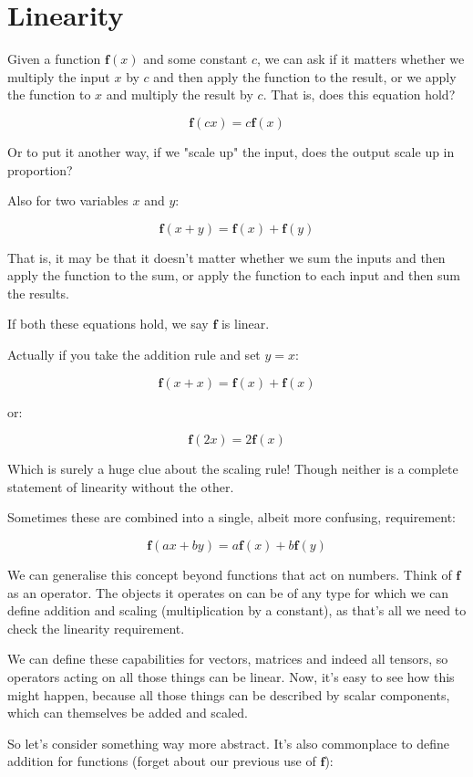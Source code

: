 \chapter{Linearity}

Given a function $\mathbf{f}(x)$ and some constant $c$, we can ask if it matters whether we multiply the input $x$ by $c$ and then apply the function to the result, or we apply the function to $x$ and multiply the result by $c$. That is, does this equation hold?

$$\mathbf{f}(cx) = c\mathbf{f}(x)$$

Or to put it another way, if we "scale up" the input, does the output scale up in proportion?

Also for two variables $x$ and $y$:

$$\mathbf{f}(x + y) = \mathbf{f}(x) + \mathbf{f}(y)$$

That is, it may be that it doesn't matter whether we sum the inputs and then apply the function to the sum, or apply the function to each input and then sum the results.

If both these equations hold, we say $\mathbf{f}$ is linear.

Actually if you take the addition rule and set $y = x$:

$$\mathbf{f}(x + x) = \mathbf{f}(x) + \mathbf{f}(x)$$

or:

$$\mathbf{f}(2x) = 2\mathbf{f}(x)$$

Which is surely a huge clue about the scaling rule! Though neither is a complete statement of linearity without the other.

Sometimes these are combined into a single, albeit more confusing, requirement:

$$\mathbf{f}(ax + by) = a\mathbf{f}(x) + b\mathbf{f}(y)$$

We can generalise this concept beyond functions that act on numbers. Think of $\mathbf{f}$ as an operator. The objects it operates on can be of any type for which we can define addition and scaling (multiplication by a constant), as that's all we need to check the linearity requirement.

We can define these capabilities for vectors, matrices and indeed all tensors, so operators acting on all those things can be linear. Now, it's easy to see how this might happen, because all those things can be described by scalar components, which can themselves be added and scaled.

So let's consider something way more abstract. It's also commonplace to define addition for functions (forget about our previous use of $\mathbf{f}$):

